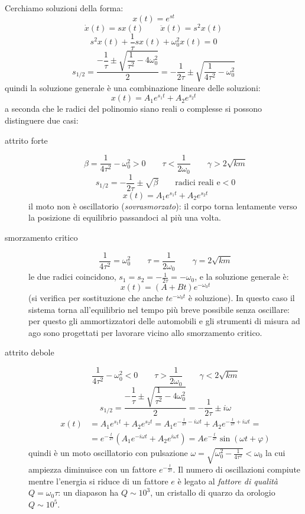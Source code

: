 Cerchiamo soluzioni della forma:
\[x(t)=e^{st}\]
\[\dot x(t)=sx(t)\qquad \ddot x(t)=s^2x(t)\]
\[s^2x(t)+\frac{1}{\tau}sx(t)+\omega_0^2x(t)=0\]
\[s_{1/2}=\dfrac{-\dfrac{1}{\tau}\pm\sqrt{\dfrac{1}{\tau^2}-4\omega_0^2}}{2}=-\frac{1}{2\tau}\pm\sqrt{\frac{1}{4\tau^2}-\omega_0^2}\]
quindi la soluzione generale è una combinazione lineare delle soluzioni:
\[
  x(t)=A_1e^{s_1t}+A_2e^{s_2t}
\]
a seconda che le radici del polinomio siano reali o complesse si possono distinguere due casi:
\begin{description}
  \item[attrito forte]
    \[\beta=\frac{1}{4\tau^2}-\omega_0^2>0\qquad\tau<\frac{1}{2\omega_0}\qquad\gamma>2\sqrt{km}\]
    \[s_{1/2}=-\frac{1}{2\tau}\pm\sqrt\beta\qquad\text{radici reali e}<0\]
    \[x(t)=A_1e^{s_1t}+A_2e^{s_2t}\]
    il moto non è oscillatorio (\emph{sovrasmorzato}): il corpo torna lentamente verso la posizione di equilibrio passandoci al più una volta.
  \item[smorzamento critico]
    \[\frac{1}{4\tau^2}=\omega_0^2\qquad \tau=\frac{1}{2\omega_0}\qquad\gamma=2\sqrt{km}\]
    le due radici coincidono, $s_1=s_2=-\frac{1}{2\tau}=-\omega_0$, e la soluzione generale è:
    \[x(t)=\left(A+Bt\right)e^{-\omega_0 t}\]
    (si verifica per sostituzione che anche $te^{-\omega_0t}$ è soluzione). In questo caso il sistema torna all'equilibrio nel tempo più breve possibile senza oscillare: per questo gli ammortizzatori delle automobili e gli strumenti di misura ad ago sono progettati per lavorare vicino allo smorzamento critico.
  \item[attrito debole]
    \[\frac{1}{4\tau^2}-\omega_0^2<0\qquad \tau>\frac{1}{2\omega_0}\qquad\gamma<2\sqrt{km}\]
    \[s_{1/2}=\dfrac{-\dfrac{1}{\tau}\pm\sqrt{\dfrac{1}{\tau^2}-4\omega_0^2}}{2}=-\frac{1}{2\tau}\pm i\omega\]
    \begin{align*}x(t) & =A_1e^{s_1t}+A_2e^{s_2t}=A_1e^{-\frac{t}{2\tau}-i\omega t}+A_2e^{-\frac{t}{2\tau}+i\omega t}=                    \\
                   & =e^{-\frac{t}{2\tau}}\left(A_1e^{-i\omega t}+A_2e^{i\omega t}\right)=A e^{-\frac{t}{2\tau}}\sin(\omega t +\varphi)\end{align*}
    quindi è un moto oscillatorio con pulsazione $\omega=\sqrt{\omega_0^2-\frac{1}{4\tau^2}}<\omega_0$ la cui ampiezza diminuisce con un fattore $e^{-\frac{t}{2\tau}}$. Il numero di oscillazioni compiute mentre l'energia si riduce di un fattore $e$ è legato al \emph{fattore di qualità} $Q=\omega_0\tau$: un diapason ha $Q\sim 10^3$, un cristallo di quarzo da orologio $Q\sim10^5$.
\end{description}

